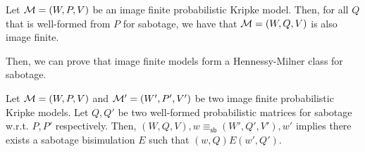 \begin{remark}\label{rem:well-formed}
   Let $\mathcal{M}=(W,P,V)$ be an image finite probabilistic Kripke model.  Then, for all ${Q}$ that is well-formed from $P$ for sabotage, we have that $\mathcal{M}=(W,{Q},V)$ is also image finite.
\end{remark}

Then, we can prove that image finite models form a Hennessy-Milner class for sabotage.

\begin{theorem}
    \label{th:hm-sab}
     Let $\mathcal{M}=(W,P,V)$ and $\mathcal{M}'=(W',P',V')$ be two image finite probabilistic Kripke models. Let ${Q},{Q'}$ be two well-formed probabilistic matrices for sabotage w.r.t. $P,P'$ respectively.  
    Then, $(W,{Q},V),w\equiv_{\mathsf{sb}}(W',{Q}',V'),w'$ implies there exists a sabotage bisimulation $E$ such that $(w,{Q})E(w',{Q}')$.
\end{theorem}
